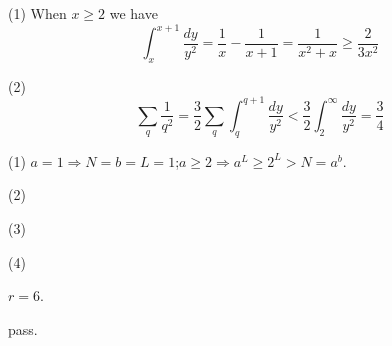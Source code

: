 \ex (1) When $x\ge 2$ we have $$\int_x^{x+1}\frac{dy}{y^2}=\frac{1}{x}-\frac{1}{x+1}=\frac{1}{x^2+x}\ge\frac{2}{3x^2}$$

(2) $$\sum_q\frac{1}{q^2}=\frac{3}{2}\sum_q\int_q^{q+1}\frac{dy}{y^2}<\frac{3}{2}\int_2^\infty\frac{dy}{y^2}=\frac{3}{4}$$

\ex (1) $a=1\Rightarrow N=b=L=1$;$a\ge2\Rightarrow a^L\ge2^L>N=a^b$.

(2) \todo 

(3) \todo

(4) \todo

\ex $r=6$.

\ex pass.
